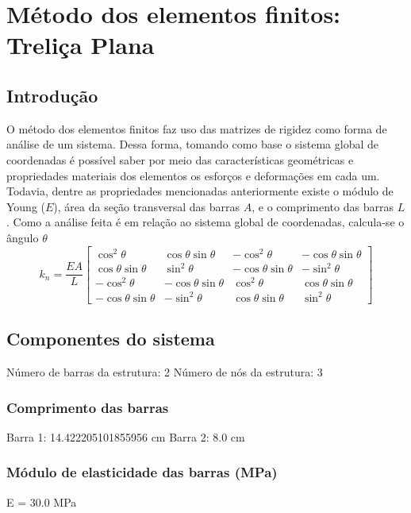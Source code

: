 \documentclass{article}%
\begin{document}
%
\normalsize%
\section{Método dos elementos finitos: Treliça Plana}%
\label{sec:MtododoselementosfinitosTreliaPlana}%
\subsection{Introdução}%
\label{subsec:Introduo}%
O método dos elementos finitos faz uso das matrizes de rigidez como forma de análise de um sistema. Dessa forma, tomando como base o sistema global de coordenadas é possível saber por meio das características geométricas e propriedades materiais dos elementos os esforços e deformações em cada um. Todavia, dentre as propriedades mencionadas anteriormente existe o módulo de Young ($E$), área da seção transversal das barras $A$, e o comprimento das barras $L$. Como a análise feita é em relação ao sistema global de coordenadas, calcula-se o ângulo $\theta$%
\[%
k_{n}=\dfrac{EA}{L} \begin{bmatrix}%
\cos^2\theta&\cos\theta\sin\theta&-\cos^2\theta&-\cos\theta\sin\theta\\%
\cos\theta\sin\theta&\sin^2\theta&-\cos\theta\sin\theta&-\sin^2\theta\\%
-\cos^2\theta&-\cos\theta\sin\theta&\cos^2\theta&\cos\theta\sin\theta\\%
-\cos\theta\sin\theta&-\sin^2\theta&\cos\theta\sin\theta&\sin^2\theta%
\end{bmatrix}%
\]

%
\subsection{Componentes do sistema}%
\label{subsec:Componentesdosistema}%
Número de barras da estrutura: 2\newline%
%
Número de nós da estrutura: 3%
\subsubsection{Comprimento das barras}%
\label{ssubsec:Comprimentodasbarras}%
Barra 1: 14.422205101855956 cm\newline%
%
Barra 2: 8.0 cm

%
\subsubsection{Módulo de elasticidade das barras (MPa)}%
\label{ssubsec:Mdulodeelasticidadedasbarras(MPa)}%
E = 30.0 MPa
\end{document}
